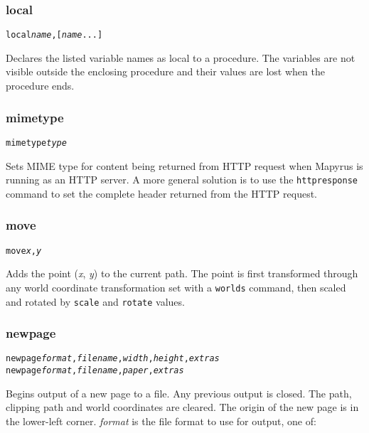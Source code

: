 \subsubsection{local}

\begin{alltt}
local \textit{name}, [\textit{name} ...]
\end{alltt}

Declares the listed variable names as local to a procedure.
The variables are not visible outside the enclosing procedure
and their values are lost when the procedure ends.

\subsubsection{mimetype}

\begin{alltt}
mimetype \textit{type}
\end{alltt}

Sets MIME type for content being returned from HTTP request
when Mapyrus is running as an HTTP server.  A more general
solution is to use the \texttt{httpresponse} command to set
the complete header returned from the HTTP request.

\subsubsection{move}

\begin{alltt}
move \textit{x}, \textit{y}
\end{alltt}

Adds the point (\textit{x}, \textit{y}) to the current path.  The
point is first transformed through any world coordinate
transformation set with a \texttt{worlds} command,
then scaled and rotated by \texttt{scale}
and \texttt{rotate} values.

\subsubsection{newpage}

\begin{alltt}
newpage \textit{format}, \textit{filename}, \textit{width}, \textit{height}, \textit{extras}
newpage \textit{format}, \textit{filename}, \textit{paper}, \textit{extras}
\end{alltt}

Begins output of a new page to a file.  Any previous output is closed.  The
path, clipping path and world coordinates are cleared.  The origin of
the new page is in the lower-left corner.  \textit{format} is the
file format to use for output, one of:

